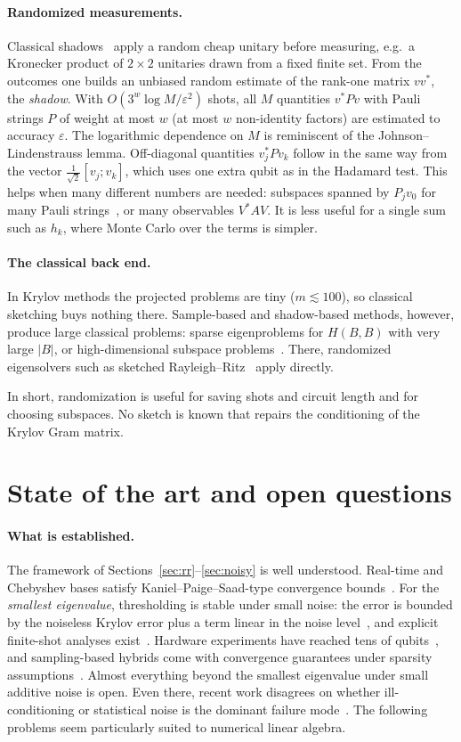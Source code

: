 \documentclass[11pt,a4paper]{article}
\begin{document}
\paragraph{Randomized measurements.} Classical shadows~\cite{HKP20}
apply a random cheap unitary before measuring, e.g.\ a Kronecker product
of $2\times2$ unitaries drawn from a fixed finite set. From the outcomes
one builds an unbiased random estimate of the rank-one matrix $vv^*$,
the \emph{shadow}. With $O(3^w\log M/\varepsilon^2)$ shots, all $M$ quantities
$v^*Pv$ with Pauli strings $P$ of weight at most $w$ (at most $w$
non-identity factors) are estimated to accuracy $\varepsilon$. The logarithmic
dependence on $M$ is reminiscent of the Johnson--Lindenstrauss lemma.
Off-diagonal quantities $v_j^*Pv_k$ follow in the same way from the vector
$\tfrac1{\sqrt2}[v_j;v_k]$, which uses one extra qubit as in the Hadamard test.
This helps when many different numbers are needed: subspaces spanned by
$P_jv_0$ for many Pauli strings~\cite{BKC24}, or many observables $V^*AV$.
It is less useful for a single sum such as $h_k$, where Monte Carlo over
the terms is simpler.

\paragraph{The classical back end.} In Krylov methods the projected
problems are tiny ($m\lesssim100$), so classical sketching buys nothing
there. Sample-based and shadow-based methods, however, produce large
classical problems: sparse eigenproblems for $H(B,B)$ with very large
$|B|$, or high-dimensional subspace problems~\cite{BKC24}. There,
randomized eigensolvers such as sketched Rayleigh--Ritz~\cite{NT24} apply
directly.

In short, randomization is useful for saving shots and circuit length
and for choosing subspaces. No sketch is known that repairs the
conditioning of the Krylov Gram matrix.

\section{State of the art and open questions}\label{sec:open}

\paragraph{What is established.} The framework of
Sections~\ref{sec:rr}--\ref{sec:noisy} is well understood. Real-time and
Chebyshev bases satisfy Kaniel--Paige--Saad-type convergence
bounds~\cite{ELN22,Kirby24,KMM23}. For the \emph{smallest eigenvalue},
thresholding is stable under small noise: the error is bounded by the
noiseless Krylov error plus a term linear in the noise
level~\cite{Kirby24}, and explicit finite-shot analyses
exist~\cite{LLH24}. Hardware experiments have reached tens of
qubits~\cite{Yoshioka25}, and sampling-based hybrids come with
convergence guarantees under sparsity assumptions~\cite{SKQD}. Almost
everything beyond the smallest eigenvalue under small additive noise is
open. Even there, recent work disagrees on whether ill-conditioning or
statistical noise is the dominant failure mode~\cite{OZG26}. The
following problems seem particularly suited to numerical linear
algebra.
\end{document}

